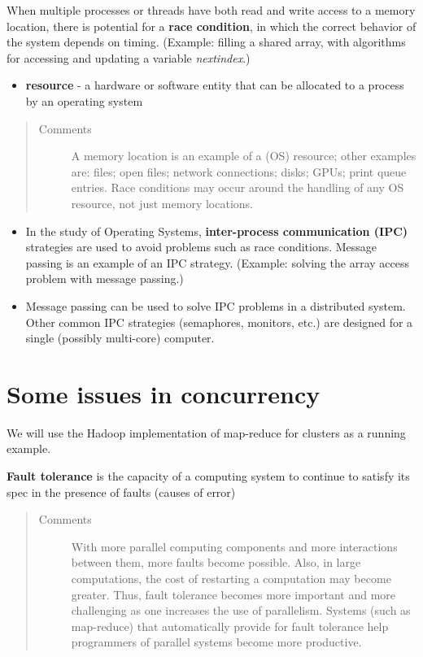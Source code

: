 \documentclass[letterpaper,10pt,openany,oneside]{sphinxmanual}
\begin{document}
When multiple processes or threads have both read and write access to a memory location, there is potential for a \textbf{race condition}, in which the correct behavior of the system depends on timing. (Example: filling a shared array, with algorithms for accessing and updating a variable \emph{nextindex}.)
\begin{itemize}
\item {} 
\textbf{resource} - a hardware or software entity that can be allocated to a process by an operating system

\end{itemize}
\begin{quote}\begin{description}
\item[{Comments}] \leavevmode
A memory location is an example of a (OS) resource; other examples are: files; open files; network connections; disks; GPUs; print queue entries. Race conditions may occur around the handling of any OS resource, not just memory locations.

\end{description}\end{quote}
\begin{itemize}
\item {} 
In the study of Operating Systems, \textbf{inter-process communication (IPC)} strategies are used to avoid problems such as race conditions. Message passing is an example of an IPC strategy. (Example: solving the array access problem with message passing.)

\item {} 
Message passing can be used to solve IPC problems in a distributed system. Other common IPC strategies (semaphores, monitors, etc.) are designed for a single (possibly multi-core) computer.

\end{itemize}


\chapter{Some issues in concurrency}
\label{ConcurrentIssue/ConcurrentIssue:some-issues-in-concurrency}\label{ConcurrentIssue/ConcurrentIssue::doc}
We will use the Hadoop implementation of map-reduce for clusters as a running example.

\textbf{Fault tolerance} is the capacity of a computing system to continue to satisfy its spec in the presence of faults (causes of error)
\begin{quote}\begin{description}
\item[{Comments}] \leavevmode
With more parallel computing components and more interactions between them, more faults become possible. Also, in large computations, the cost of restarting a computation may become greater. Thus, fault tolerance becomes more important and more challenging as one increases the use of parallelism. Systems (such as map-reduce) that automatically provide for fault tolerance help programmers of parallel systems become more productive.

\end{description}\end{quote}
\end{document}

